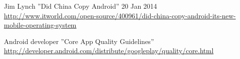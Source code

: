 \documentclass[conference]{IEEEtran}
\begin{document}
\begin{thebibliography}{1}




Jim Lynch ''Did China Copy Android''  20 Jan 2014 \url{http://www.itworld.com/open-source/400961/did-china-copy-android-its-new-mobile-operating-system} 

Android developer ''Core App Quality Guidelines''
\url{http://developer.android.com/distribute/googleplay/quality/core.html}

\end{thebibliography}
\end{document}
